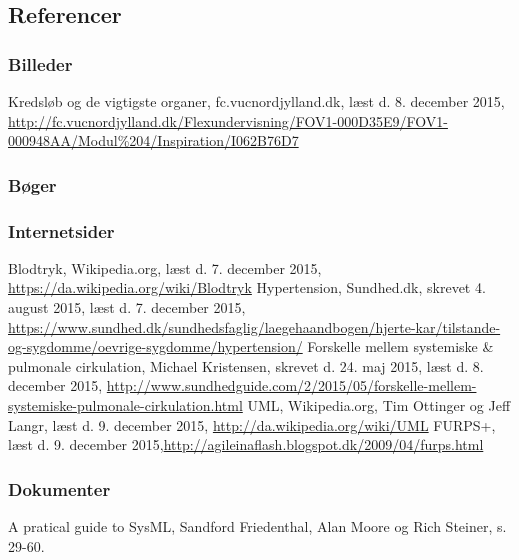 \begin{thebibliography}{99}
\section{Referencer}
\subsubsection{Billeder}
Kredsløb og de vigtigste organer, fc.vucnordjylland.dk, læst d. 8. december 2015, \url{http://fc.vucnordjylland.dk/Flexundervisning/FOV1-000D35E9/FOV1-000948AA/Modul\%204/Inspiration/I062B76D7}
\subsubsection{Bøger}

\subsubsection{Internetsider}
Blodtryk, Wikipedia.org, læst d. 7. december 2015, \url{https://da.wikipedia.org/wiki/Blodtryk}
Hypertension, Sundhed.dk, skrevet 4. august 2015, læst d. 7. december 2015,
\url{https://www.sundhed.dk/sundhedsfaglig/laegehaandbogen/hjerte-kar/tilstande-og-sygdomme/oevrige-sygdomme/hypertension/}
Forskelle mellem systemiske \& pulmonale cirkulation, Michael Kristensen, skrevet d. 24. maj 2015, læst d. 8. december 2015, \url{http://www.sundhedguide.com/2/2015/05/forskelle-mellem-systemiske-pulmonale-cirkulation.html}
UML, Wikipedia.org, Tim Ottinger og Jeff Langr, læst d. 9. december 2015, \url{http://da.wikipedia.org/wiki/UML}
FURPS+, læst d. 9. december 2015,\url{http://agileinaflash.blogspot.dk/2009/04/furps.html}

\subsubsection{Dokumenter}
A pratical guide to SysML, Sandford Friedenthal, Alan Moore og Rich Steiner, s. 29-60.
\end{thebibliography}